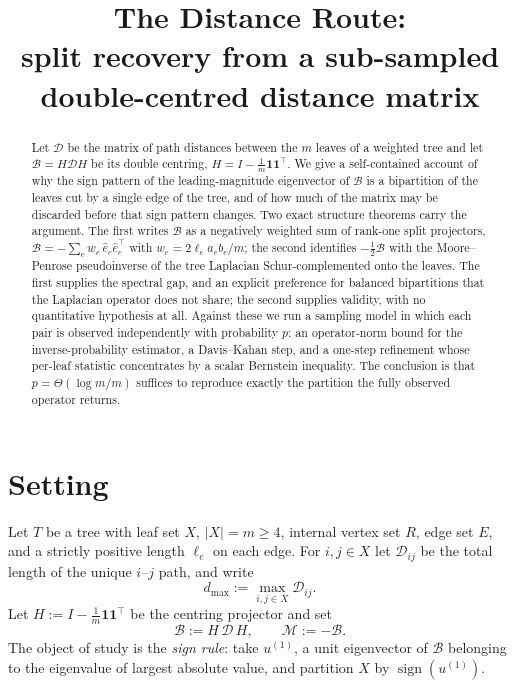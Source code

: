 \documentclass[11pt]{article}
\title{The Distance Route:\\
       split recovery from a sub-sampled double-centred distance matrix}
\author{}
\date{}
\theoremstyle{plain}
\theoremstyle{definition}
\theoremstyle{remark}
\providecommand{\Dmat}{\mathcal{D}}          %
\providecommand{\Bop}{\mathcal{B}}           %
\providecommand{\Mop}{\mathcal{M}}           %
\providecommand{\uone}{u^{(1)}}
\providecommand{\1}{\mathbf{1}}
\newcommand{\dmax}{d_{\max}}
\newcommand{\ehat}{\hat{e}}
\begin{document}
\maketitle

\begin{abstract}
Let $\Dmat$ be the matrix of path distances between the $m$ leaves of a weighted
tree and let $\Bop=H\Dmat H$ be its double centring, $H=I-\tfrac1m\1\1^\top$. We
give a self-contained account of why the sign pattern of the leading-magnitude
eigenvector of $\Bop$ is a bipartition of the leaves cut by a single edge of the
tree, and of how much of the matrix may be discarded before that sign pattern
changes. Two exact structure theorems carry the argument. The first writes
$\Bop$ as a negatively weighted sum of rank-one split projectors,
$\Bop=-\sum_{e}w_e\,\ehat_e\ehat_e^\top$ with $w_e=2\ell_e a_e b_e/m$; the second
identifies $-\tfrac12\Bop$ with the Moore--Penrose pseudoinverse of the tree
Laplacian Schur-complemented onto the leaves. The first supplies the spectral
gap, and an explicit preference for balanced bipartitions that the Laplacian
operator does not share; the second supplies validity, with no quantitative
hypothesis at all. Against these we run a sampling model in which each pair is
observed independently with probability $p$: an operator-norm bound for the
inverse-probability estimator, a Davis--Kahan step, and a one-step refinement
whose per-leaf statistic concentrates by a scalar Bernstein inequality. The
conclusion is that $p=\Theta(\log m/m)$ suffices to reproduce exactly the
partition the fully observed operator returns.
\end{abstract}

\section{Setting}\label{d:sec:setup}

Let $T$ be a tree with leaf set $X$, $|X|=m\ge 4$, internal vertex set $R$, edge
set $E$, and a strictly positive length $\ell_e$ on each edge. For $i,j\in X$
let $\Dmat_{ij}$ be the total length of the unique $i$--$j$ path, and write
\begin{equation}\label{d:eq:dmax}
  \dmax:=\max_{i,j\in X}\Dmat_{ij}.
\end{equation}
Let $H:=I-\tfrac1m\1\1^\top$ be the centring projector and set
\begin{equation}\label{d:eq:bdef}
  \Bop:=H\,\Dmat\,H,\qquad \Mop:=-\Bop .
\end{equation}
The object of study is the \emph{sign rule}: take $\uone$, a unit eigenvector of
$\Bop$ belonging to the eigenvalue of largest absolute value, and partition $X$
by $\operatorname{sign}(\uone)$.
\end{document}
